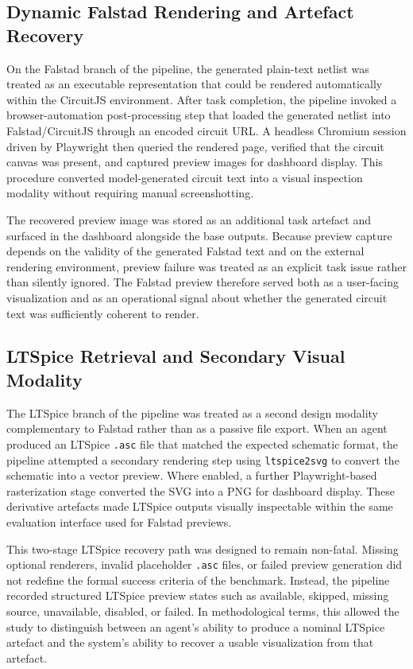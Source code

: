 \subsection{Dynamic Falstad Rendering and Artefact Recovery}

On the Falstad branch of the pipeline, the generated plain-text netlist was treated as an executable representation that could be rendered automatically within the CircuitJS environment. After task completion, the pipeline invoked a browser-automation post-processing step that loaded the generated netlist into Falstad/CircuitJS through an encoded circuit URL. A headless Chromium session driven by Playwright then queried the rendered page, verified that the circuit canvas was present, and captured preview images for dashboard display. This procedure converted model-generated circuit text into a visual inspection modality without requiring manual screenshotting.

The recovered preview image was stored as an additional task artefact and surfaced in the dashboard alongside the base outputs. Because preview capture depends on the validity of the generated Falstad text and on the external rendering environment, preview failure was treated as an explicit task issue rather than silently ignored. The Falstad preview therefore served both as a user-facing visualization and as an operational signal about whether the generated circuit text was sufficiently coherent to render.

\subsection{LTSpice Retrieval and Secondary Visual Modality}

The LTSpice branch of the pipeline was treated as a second design modality complementary to Falstad rather than as a passive file export. When an agent produced an LTSpice \texttt{.asc} file that matched the expected schematic format, the pipeline attempted a secondary rendering step using \texttt{ltspice2svg} to convert the schematic into a vector preview. Where enabled, a further Playwright-based rasterization stage converted the SVG into a PNG for dashboard display. These derivative artefacts made LTSpice outputs visually inspectable within the same evaluation interface used for Falstad previews.

This two-stage LTSpice recovery path was designed to remain non-fatal. Missing optional renderers, invalid placeholder \texttt{.asc} files, or failed preview generation did not redefine the formal success criteria of the benchmark. Instead, the pipeline recorded structured LTSpice preview states such as available, skipped, missing source, unavailable, disabled, or failed. In methodological terms, this allowed the study to distinguish between an agent's ability to produce a nominal LTSpice artefact and the system's ability to recover a usable visualization from that artefact.

